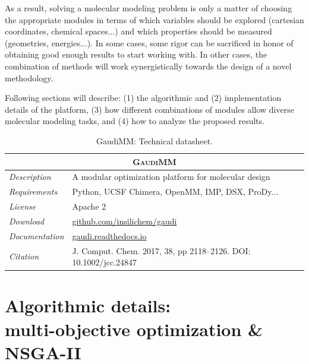 As a result, solving a molecular modeling problem is only a matter of choosing the appropriate modules in terms of which variables should be explored (cartesian coordinates, chemical spaces...) and which properties should be measured (geometries, energies...). In some cases, some rigor can be sacrificed in honor of obtaining good enough results to start working with. In other cases, the combination of methods will work synergistically towards the design of a novel methodology.

Following sections will describe: (1) the algorithmic and (2) implementation details of the platform, (3) how different combinations of modules allow diverse molecular modeling tasks, and (4) how to analyze the proposed results.



\begin{table}[hbtp]
	\caption[GaudiMM: Technical datasheet]{GaudiMM: Technical datasheet.}
	\footnotesize
	\newcommand{\tableheading}[1]{\multicolumn{2}{c}{\textsc{#1}}}
	\begin{tabularx}{\textwidth}{RL}
		\toprule
		\tableheading{GaudiMM} \\
		\toprule
		\textit{Description} & A modular optimization platform for molecular design \\
		\midrule
		\textit{Requirements} & Python, UCSF Chimera, OpenMM, IMP, DSX, ProDy... \\
		\midrule
		\textit{License} & Apache 2 \\
		\midrule
		\textit{Download} & \href{https://github.com/insilichem/gaudi}{github.com/insilichem/gaudi} \\
		\midrule
		\textit{Documentation} & \href{https://gaudi.readthedocs.io}{gaudi.readthedocs.io} \\
		\midrule
		\textit{Citation} & J. Comput. Chem. 2017, 38, pp 2118–2126. DOI: 10.1002/jcc.24847 \\
		\bottomrule

	\end{tabularx}
\end{table}



\section[Algorithmic details]{Algorithmic details: \\ multi-objective optimization \& NSGA-II}

